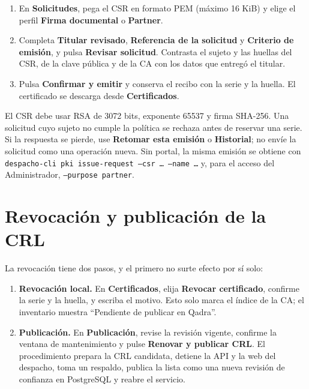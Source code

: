 \begin{enumerate}
  \item En \textbf{Solicitudes}, pega el CSR en formato PEM (máximo 16 KiB) y
        elige el perfil \textbf{Firma documental} o \textbf{Partner}.
  \item Completa \textbf{Titular revisado}, \textbf{Referencia de la
        solicitud} y \textbf{Criterio de emisión}, y pulsa \textbf{Revisar
        solicitud}. Contrasta el sujeto y las huellas del CSR, de la clave
        pública y de la CA con los datos que entregó el titular.
  \item Pulsa \textbf{Confirmar y emitir} y conserva el recibo con la serie y
        la huella. El certificado se descarga desde \textbf{Certificados}.
\end{enumerate}

El CSR debe usar RSA de 3072 bits, exponente 65537 y firma SHA-256. Una
solicitud cuyo sujeto no cumple la política se rechaza antes de reservar una
serie. Si la respuesta se pierde, use \textbf{Retomar esta emisión} o
\textbf{Historial}; no envíe la solicitud como una operación nueva. Sin
portal, la misma emisión se obtiene con
\texttt{despacho-cli pki issue-request --csr \ldots{} --name \ldots{}} y,
para el acceso del Administrador, \texttt{--purpose partner}.


\section{Revocación y publicación de la CRL}\label{sec:ca-revocacion}

La revocación tiene dos pasos, y el primero no surte efecto por sí solo:

\begin{enumerate}
  \item \textbf{Revocación local.} En \textbf{Certificados}, elija
        \textbf{Revocar certificado}, confirme la serie y la huella, y
        escriba el motivo. Esto solo marca el índice de la CA; el inventario
        muestra \enquote{Pendiente de publicar en Qadra}.
  \item \textbf{Publicación.} En \textbf{Publicación}, revise la revisión
        vigente, confirme la ventana de mantenimiento y pulse \textbf{Renovar
        y publicar CRL}. El procedimiento prepara la CRL candidata, detiene
        la API y la web del despacho, toma un respaldo, publica la lista
        como una nueva revisión de confianza en PostgreSQL y reabre el
        servicio.
\end{enumerate}

